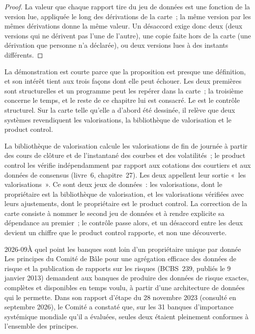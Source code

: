 \begin{proof}
La valeur que chaque rapport tire du jeu de données est une fonction de la version lue, appliquée le long des dérivations de la carte~; la même version
par les mêmes dérivations donne la même valeur. Un désaccord exige donc deux  (deux versions qui
ne dérivent pas l'une de l'autre), une copie faite hors de la carte (une dérivation que personne n'a déclarée), ou deux versions lues à
des instants différents.
\end{proof}

La démonstration est courte parce que la proposition est presque une définition, et son intérêt tient aux trois façons dont elle peut échouer. Les deux
premières sont structurelles et un programme peut les repérer dans la carte~; la troisième concerne le temps, et le reste de ce chapitre lui est consacré.
Le  est le contrôle structurel. Sur la carte telle qu'elle a d'abord été dessinée, il relève que deux systèmes
revendiquent les valorisations, la bibliothèque de valorisation et le product control.

\begin{example}\label{ex:pl:the-platform-map:marks}
La bibliothèque de valorisation calcule les valorisations de fin de journée à partir des cours de clôture et de l'instantané des courbes et des volatilités~; le product
control les vérifie indépendamment par rapport aux cotations des courtiers et aux données de consensus (livre~6, chapitre~27). Les deux appellent
leur sortie «~les valorisations~». Ce sont deux jeux de données~: les valorisations, dont le propriétaire est la bibliothèque de valorisation, et les
valorisations vérifiées avec leurs ajustements, dont le propriétaire est le product control. La correction de la carte consiste à nommer le second jeu de
données et à rendre explicite sa dépendance au premier~; le contrôle passe alors, et un désaccord entre les deux devient un chiffre que le product control
rapporte, et non une découverte.
\end{example}

\label{lst:pl:the-platform-map:validate}

\begin{dated}{2026-09}{À quel point les banques sont loin d'un propriétaire unique par donnée}\label{dat:pl:the-platform-map:bcbs}
Les principes du Comité de Bâle pour une agrégation efficace des données de risque et la publication de rapports sur les risques (BCBS~239, publiés le 9 janvier 2013)
demandent aux banques de produire des données de risque exactes, complètes et disponibles en temps voulu, à partir d'une architecture de données qui le permette. Dans son
rapport d'étape du 28 novembre 2023 (consulté en septembre 2026), le Comité a constaté que, sur les 31 banques d'importance systémique mondiale
qu'il a évaluées, seules deux étaient pleinement conformes à l'ensemble des principes.
\end{dated}

